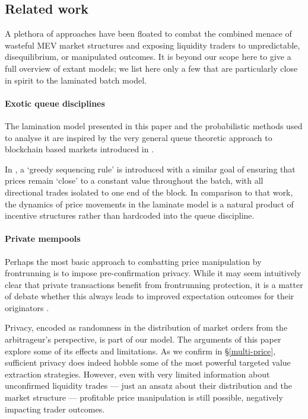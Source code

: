 \subsection{Related work}

A plethora of approaches have been floated to combat the combined menace of wasteful MEV market structures and exposing liquidity traders to unpredictable, disequilibrium, or manipulated outcomes.
%
It is beyond our scope here to give a full overview of extant models; we list here only a few that are particularly close in spirit to the laminated batch model.

\paragraph{Exotic queue disciplines}
The lamination model presented in this paper and the probabilistic methods used to analyse it are inspired by the very general queue theoretic approach to blockchain based markets introduced in \cite{macpherson2023adversarial}.

In \cite{ferreira2022credible}, a `greedy sequencing rule' is introduced with a similar goal of ensuring that prices remain `close' to a constant value throughout the batch, with all directional trades isolated to one end of the block.
%
%
In comparison to that work, the dynamics of price movements in the laminate model is a natural product of incentive structures rather than hardcoded into the queue discipline.

\paragraph{Private mempools}
Perhaps the most basic approach to combatting price manipulation by frontrunning is to impose pre-confirmation privacy.
%
While it may seem intuitively clear that private transactions benefit from frontrunning protection, it is a matter of debate whether this always leads to improved expectation outcomes for their originators \cite{schoneborn2009liquidation,marshall2023false}.

Privacy, encoded as randomness in the distribution of market orders from the arbitrageur's perspective, is part of our model.
%
The arguments of this paper explore some of its effects and limitations.
%
As we confirm in \S\ref{multi-price}, sufficient privacy does indeed hobble some of the most powerful targeted value extraction strategies.
%
However, even with very limited information about unconfirmed liquidity trades --- just an ansatz about their distribution and the market structure --- profitable price manipulation is still possible, negatively impacting trader outcomes.


